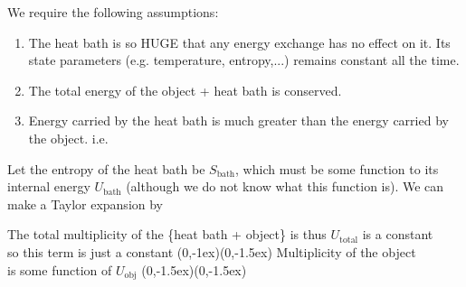 \documentclass[class=article, crop=false, 12pt]{standalone}
\begin{document}

We require the following assumptions: 
\begin{enumerate}
    \item The heat bath is so HUGE that any energy exchange has no effect on it.
    Its state parameters (e.g. temperature, entropy,...) remains constant all the time. 

    \item The total energy of the object + heat bath is conserved.
    \item Energy carried by the heat bath is much greater than the energy carried by the object. i.e.
\end{enumerate}

Let the entropy of the heat bath be $S_\text{bath}$,
which must be some function to its internal energy $U_\text{bath}$ 
(although we do not know what this function is).
We can make a Taylor expansion by

The total multiplicity of the \{heat bath + object\} is thus
{\scriptsize $U_\text{total}$ is a constant\\[-1ex]\scriptsize so this term is just a constant}
{(0,-1ex)}{(0,-1.5ex)}
{\scriptsize Multiplicity of the object\\[-1ex]\scriptsize is some function of $U_\text{obj}$}
{(0,-1.5ex)}{(0,-1.5ex)}
\end{document}
